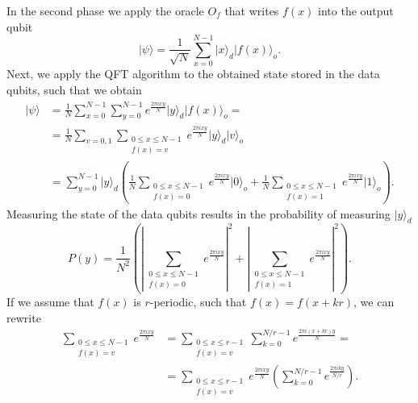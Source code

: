 \documentclass[12pt]{article}
\newcommand{\ket}[1]{\ensuremath{|{#1}\rangle}}
\begin{document}
In the second phase we apply the oracle $O_f$ that writes $f(x)$ into the output qubit
\begin{equation}
\label{before_QFT}
\ket{\psi} = \frac{1}{\sqrt{N}}\sum_{x=0}^{N-1}\ket{x}_{d}\ket{f(x)}_o.
\end{equation}
Next, we apply the QFT algorithm to the obtained state stored in the data qubits, such that we obtain
\begin{align}
\label{After_QFT}
\ket{\psi} &= \frac{1}{N}\sum_{x=0}^{N-1}\sum_{y=0}^{N-1}e^{\frac{2\pi i x y}{N}}\ket{y}_{d}\ket{f(x)}_o = \\
&= \frac{1}{N}\sum_{v=0,1}\sum_{\substack{0 \le x \le N-1 \\ f(x) = v}}e^{\frac{2\pi i x y}{N}}\ket{y}_{d}\ket{v}_o \\
&= \sum_{y=0}^{N-1}\ket{y}_d \left( \frac{1}{N} \sum_{\substack{0 \le x \le N-1 \\ f(x) = 0}}e^{\frac{2 \pi i x y}{N}} \ket{0}_o +  \frac{1}{N} \sum_{\substack{0 \le x \le N-1 \\ f(x) = 1}}e^{\frac{2 \pi i x y}{N}} \ket{1}_o\right).
\end{align}
Measuring the state of the data qubits results in the probability of measuring $\ket{y}_d$
\begin{equation}
\label{QPF_theory_prediction}
P(y) = \frac{1}{N^2} \left( \left|\sum_{\substack{0 \le x \le N-1 \\ f(x) = 0}}e^{\frac{2\pi i x y}{N}}\right|^2 + \left|\sum_{\substack{0 \le x \le N-1 \\ f(x) = 1}}e^{\frac{2\pi i x y}{N}}\right|^2 \right).
\end{equation}
If we assume that $f(x)$ is $r$-periodic, such that $f(x) = f(x+kr)$, we can rewrite
\begin{align}
\sum_{\substack{0 \le x \le N-1 \\ f(x) = v}}e^{\frac{2\pi i x y}{N}} &= \sum_{\substack{0 \le x \le r-1 \\ f(x) = v}} \sum_{k=0}^{N/r-1}e^{\frac{2\pi i (x+kr) y}{N}} = \\
&= \sum_{\substack{0 \le x \le r-1 \\ f(x) = v}} e^{\frac{2\pi i x y}{N}} \left(\sum_{k=0}^{N/r-1}e^{\frac{2\pi i k y}{N/r}}\right).
\end{align}
\end{document}
